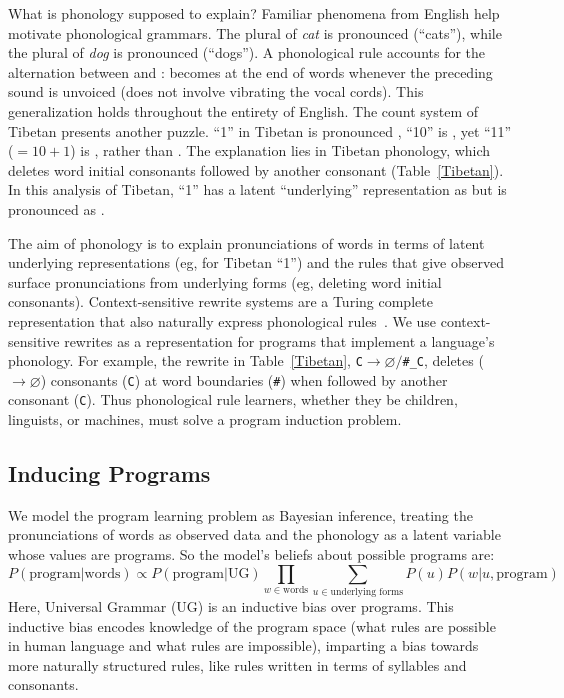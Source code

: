 \documentclass{article}
\begin{document}
What is phonology supposed to explain? Familiar phenomena from
English help motivate phonological grammars.  The plural of \emph{cat}
is pronounced  (``cats''), while the plural of
\emph{dog} is pronounced  (``dogs''). A phonological
rule accounts for the alternation between  and :
 becomes  at the end of words whenever the
preceding sound is unvoiced (does not involve vibrating the vocal
cords). This generalization holds throughout the entirety of English.
The count system of Tibetan presents another puzzle.
``1'' in Tibetan is pronounced
, ``10'' is ,
yet ``11'' ($ = 10 + 1$) is ,
rather than .
The explanation lies in Tibetan phonology,
which deletes word initial consonants followed by another consonant (Table~\ref{Tibetan}).
In this analysis of Tibetan,
``1'' has a latent ``underlying'' representation as 
but is pronounced as .

The aim of phonology is to explain pronunciations of words in terms of
latent underlying representations (eg,  for Tibetan
``1'') and the rules that give observed surface pronunciations from
underlying forms (eg, deleting word initial consonants).
Context-sensitive rewrite systems are a Turing complete representation
that also naturally express phonological
rules~\cite{chomsky1968sound}.  We use context-sensitive rewrites as a
representation for programs that implement a language's phonology.
For example, the rewrite in Table~\ref{Tibetan},
\verb|C|$\to\varnothing /$\verb|#_C|, deletes ($\to\varnothing $)
consonants (\verb|C|) at word boundaries (\verb|#|) when followed by
another consonant (\verb|C|).
Thus phonological rule learners, whether they be children, linguists, or machines, must solve a program induction problem.

\subsection{Inducing Programs}
We model the program learning problem as Bayesian inference, treating the pronunciations of words as observed data and the phonology as a latent variable whose values are programs. So the model's beliefs about possible programs are:
\begin{equation}
  P(\text{program}|\text{words})\propto P(\text{program}|\text{UG})\prod_{w\in\text{words}}\sum_{u\in\text{underlying forms}} P(u)P(w|u,\text{program})
  \end{equation}
Here, Universal Grammar (UG) is an inductive bias over programs. This inductive bias encodes knowledge of the program space (what rules are possible in human language and what rules are impossible), imparting a bias towards more naturally structured rules, like rules written in terms of syllables and consonants.
\end{document}
